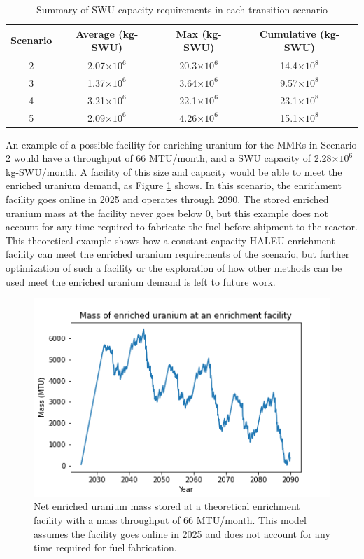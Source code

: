 \begin{table}
    \centering
    \caption{Summary of \gls{SWU} capacity requirements in each transition scenario}
    \label{tab:SWU_summary}
    \begin{tabular}{c c c c}
        \hline
        Scenario & Average (kg-SWU) & Max (kg-SWU) & Cumulative  (kg-SWU) \\\hline
        2 & 2.07$\times 10^6$ & 20.3$\times 10^6$ & 14.4$\times 10^8$ \\
        3 & 1.37$\times 10^6$ & 3.64$\times 10^6$ & 9.57$\times 10^8$ \\
        4 & 3.21$\times 10^6$ & 22.1$\times 10^6$ & 23.1$\times 10^8$ \\
        5 & 2.09$\times 10^6$ & 4.26$\times 10^6$ & 15.1$\times 10^8$
        \\\hline       
    \end{tabular}
\end{table}

An example of a possible facility for enriching uranium for the \glspl{MMR} in 
Scenario 2 would 
have a throughput of 66 MTU/month, and a \gls{SWU} capacity of 2.28$\times 10^6$
kg-SWU/month. A facility of this size and capacity would be able to meet the 
enriched uranium demand, as Figure \ref{fig:enrich_storage}
shows. In this scenario, the enrichment facility goes online in 2025 and operates 
through 2090. The stored enriched uranium mass at the facility never goes below 0, 
but this example does not 
account for any time required to fabricate the fuel before shipment to the reactor.
This theoretical example shows how a constant-capacity \gls{HALEU} enrichment 
facility can meet the enriched uranium requirements of the scenario, but further 
optimization of such a facility or the exploration of how other methods can be
used meet the enriched uranium demand is left to future work. 

\begin{figure}
    \centering
    \includegraphics[width=\textwidth]{../figures/potential_uranium_stockpile.png}
    \caption{Net enriched uranium mass stored at a theoretical enrichment facility with 
    a mass throughput of 66 MTU/month. This model assumes the facility goes online in 2025
    and does not account for any time required for fuel fabrication.}
    \label{fig:enrich_storage}
\end{figure}
